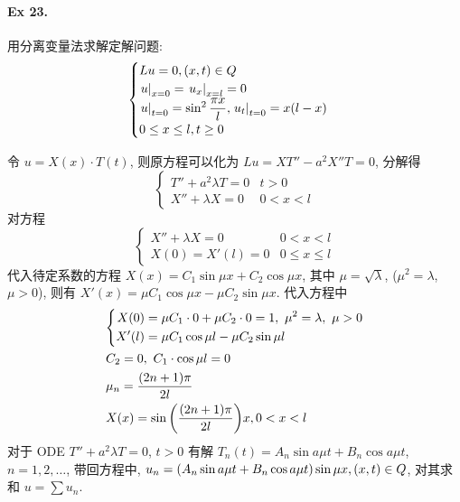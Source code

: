 \paragraph{Ex 23.}
用分离变量法求解定解问题:
\[ \begin{cases}
Lu = 0, (x, t) \in Q \\
{\left.{u} \right|}_{x=0} = {\left.{u_x} \right|}_{x=l} = 0 \\
{\left.{u} \right|}_{t=0} = \sin^2 \dfrac{\pi x}{l}, {\left.{u_t} \right|}_{t=0} = x(l - x) \\
0 \leq x \leq l,  t \geq 0
\end{cases} \]

\begin{solution}
令 $u = X(x) \cdot T(t)$, 则原方程可以化为 $Lu = XT'' - a^2 X''T = 0$, 分解得
\[ \begin{cases}
T'' + a^2 \lambda T = 0 & t > 0 \\
X'' + \lambda X = 0 & 0 < x < l
\end{cases} \]
对方程
\[ \begin{cases}
X'' + \lambda X = 0 & 0 < x < l \\
X(0) = X'(l) = 0 & 0 \leq x \leq l
\end{cases} \]
代入待定系数的方程 $X(x) = C_1 \sin \mu x + C_2 \cos \mu x$, 其中
$\mu = \sqrt\lambda$, ($\mu^2 = \lambda$, $\mu > 0$), 则有
$X'(x) = \mu C_1 \cos \mu x - \mu C_2 \sin \mu x$. 代入方程中
\begin{align*}
& \mequlist{
    X(0) &= \mu C_1\cdot 0 + \mu C_2\cdot 0 = 1,\ \mu^2 = \lambda,\ \mu > 0 \\
    X'(l) &= \mu C_1 \cos \mu l - \mu C_2 \sin \mu l
} \\
& C_2 = 0,\ C_1 \cdot \cos \mu l = 0 \\
& \mu_n = \frac{(2n+1)\pi}{2l} \\
& X(x) = \sin \mclosure{\frac{(2n+1)\pi}{2l}} x, 0 < x < l
\end{align*}
对于 ODE $T'' + a^2\lambda T = 0$, $t > 0$ 有解
$T_n(t) = A_n \sin a \mu t + B_n \cos a \mu t$, $n = 1, 2, \ldots$, 带回方程中,
$u_n = {\left( {A_n \sin a \mu t + B_n \cos a \mu t} \right)} \sin \mu x, (x, t) \in Q$,
对其求和 $u = \sum u_n$.


\end{solution}
